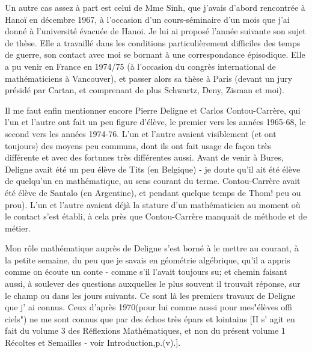 {Un autre cas assez à part est celui de Mme Sinh, que j'avais d'abord rencontrée à Hanoï en décembre 1967, à l'occasion d'un cours-séminaire d'un mois que j'ai donné à l'université évacuée de Hanoi. Je lui ai proposé l'année suivante son sujet de thèse. Elle a travaillé dans les conditions particulièrement difficiles des temps de guerre, son contact avec moi se bornant à une correspondance épisodique. Elle a pu venir en France en 1974/75 (à l'occasion du congrès international de mathématiciens à Vancouver), et passer alors sa thèse à Paris (devant un jury présidé par Cartan, et comprenant de plus Schwartz, Deny, Zisman et moi).

Il me faut enfin mentionner encore Pierre Deligne et Carlos Contou-Carrère, qui l'un et l'autre ont fait un peu figure d'élève, le premier vers les années 1965-68, le second vers les années 1974-76. L'un et l'autre avaient visiblement (et ont toujours) des moyens peu communs, dont ils ont fait usage de façon très différente et avec des fortunes très différentes aussi. Avant de venir à Bures, Deligne avait été un peu élève de Tits (en Belgique) - je doute qu'il ait été élève de quelqu'un en mathématique, au sens courant du terme. Contou-Carrère avait été élève de Santalo (en Argentine), et pendant quelque temps de Thom! peu ou prou). L'un et l'autre avaient déjà la stature d'un mathématicien au moment où le contact s'est établi, à cela près que Contou-Carrère manquait de méthode et de métier.

Mon rôle mathématique auprès de Deligne s'est borné à le mettre au courant, à la petite semaine, du peu que je savais en géométrie algébrique, qu'il a appris comme on écoute un conte - comme s'il l'avait toujours su; et chemin faisant aussi, à soulever des questions auxquelles le plus souvent il trouvait réponse, sur le champ ou dans les jours suivants. Ce sont là les premiers travaux de Deligne que j' ai connus. Ceux d'après 1970(pour lui comme aussi pour mes"élèves offi ciels") ne me sont connus que par des échos très épars et lointains [II s' agit en fait du volume 3 des Réflexions Mathématiques, et non du présent volume 1 Récoltes et Semailles - voir Introduction,p.(v).].

}
